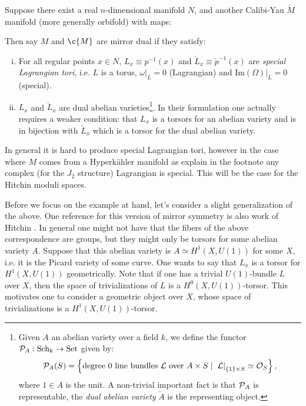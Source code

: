 Suppose there exist a real $n$-dimensional manifold $N$, and another
Calibi-Yau $\check{M}$ manifold (more generally orbifold) with maps:

\begin{figure}[h!]
\centering
{}
\end{figure}

Then \cite{SYZ} say $M$ and $\c{M}$ are mirror dual if they satisfy:
\begin{enumerate}[(i)]
\item For all regular points $x \in N$, $L_x\equiv p^{-1}(x)$ and
  $\check{L}_x\equiv \check{p}^{-1}(x)$ are \emph{special Lagrangian tori},
  i.e. $L$ is a torus, $\left.\omega\right|_{L}=0$ (Lagrangian) and
  $\left.\mbox{Im}(\Omega)\right|_{L}=0$ (special).
\item $L_x$ and $\check{L}_x$ are dual abelian varieties\footnote{Given
    $A$ an abelian variety over a field $k$, we define the functor
$\mathcal{P}_A: \mbox{Sch}_{k} \rightarrow \mbox{Set}$ given by:
\[\mathcal{P}_A(S) = \left\{\mbox{degree 0 line bundles } \mathcal{L} \mbox{ over }A\times S \; | \;
\left.\mathcal{L}\right|_{\{1\}\times S} \simeq \mathcal{O}_S\right\},\]
where $1 \in A$ is the unit. A non-trivial important fact is that
$\mathcal{P}_A$ is representable, the \emph{dual abelian variety} $\check{A}$ is
the representing object.}. In their formulation one actually requires
a weaker condition: that $L_x$ is a torsors for an abelian variety and
is in bijection with $\check{L}_x$ which is a torsor for the dual abelian
variety.
\end{enumerate}

\begin{rem*}
In general it is hard to produce special Lagrangian tori, however in
the case where $M$ comes from a Hyperk\"ahler manifold as explain in
the footnote any complex (for the $J_2$ structure) Lagrangian is
special. This will be the case for the Hitchin moduli spaces.
\end{rem*}

Before we focus on the example at hand, let's consider a slight
generalization of the above. One reference for this version of mirror
symmetry is also work of Hitchin \cite{H5}. In general
one might not have that the fibers of the above correspondence are
groups, but they might only be torsors for some abelian
variety $A$. Suppose that this abelian variety is $A \simeq
H^1(X,U(1))$ for some $X$, i.e. it is the Picard variety of some
curve. One wants to say that $L_x$ is a torsor for $H^1(X,U(1))$
geometrically. Note that if one has a trivial $U(1)$-bundle $L$ over
$X$, then the space of trivializations of $L$ is a
$H^0(X,U(1))$-torsor. This motivates one to consider a geometric
object over $X$, whose space of trivializations is a
$H^1(X,U(1))$-torsor.

